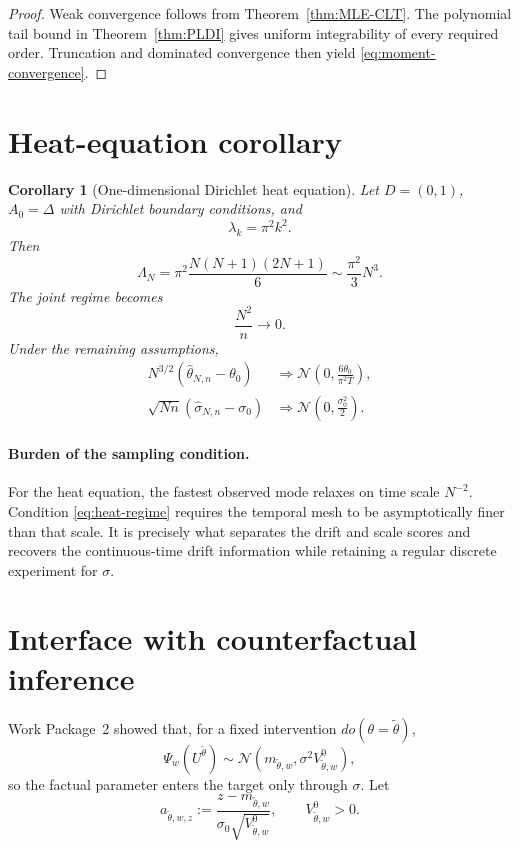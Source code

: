 \documentclass[11pt]{article}
\newtheorem{corollary}[assumption]{Corollary}
\theoremstyle{remark}
\newcommand{\1}{\mathbf 1}
\newcommand{\LamN}{\Lambda_N}
\begin{document}
\begin{proof}
Weak convergence follows from Theorem~\ref{thm:MLE-CLT}.  The polynomial tail bound in Theorem~\ref{thm:PLDI} gives uniform integrability of every required order.  Truncation and dominated convergence then yield \eqref{eq:moment-convergence}.
\end{proof}

\section{Heat-equation corollary}

\begin{corollary}[One-dimensional Dirichlet heat equation]\label{cor:heat}
Let $D=(0,1)$, $A_0=\Delta$ with Dirichlet boundary conditions, and
\[
 \lambda_k=\pi^2k^2.
\]
Then
\[
 \LamN
 =\pi^2\frac{N(N+1)(2N+1)}6
 \sim\frac{\pi^2}{3}N^3.
\]
The joint regime becomes
\begin{equation}\label{eq:heat-regime}
 \frac{N^2}{n}\longrightarrow0.
\end{equation}
Under the remaining assumptions,
\begin{align}
 N^{3/2}(\widehat\theta_{N,n}-\theta_0)
 &\Rightarrow
 \mathcal N\!\left(0,\frac{6\theta_0}{\pi^2T}\right),\label{eq:heat-theta}\\
 \sqrt{Nn}(\widehat\sigma_{N,n}-\sigma_0)
 &\Rightarrow
 \mathcal N\!\left(0,\frac{\sigma_0^2}{2}\right).
 \label{eq:heat-sigma}
\end{align}
\end{corollary}

\paragraph{Burden of the sampling condition.}
For the heat equation, the fastest observed mode relaxes on time scale $N^{-2}$.  Condition \eqref{eq:heat-regime} requires the temporal mesh to be asymptotically finer than that scale.  It is precisely what separates the drift and scale scores and recovers the continuous-time drift information while retaining a regular discrete experiment for $\sigma$.

\section{Interface with counterfactual inference}

Work Package~2 showed that, for a fixed intervention $do(\theta=\widetilde\theta)$,
\[
 \Psi_w(U^{\widetilde\theta})
 \sim\mathcal N(m_{\widetilde\theta,w},\sigma^2V^0_{\widetilde\theta,w}),
\]
so the factual parameter enters the target only through $\sigma$.  Let
\[
 a_{\widetilde\theta,w,z}
 :=\frac{z-m_{\widetilde\theta,w}}
 {\sigma_0\sqrt{V^0_{\widetilde\theta,w}}},
 \qquad V^0_{\widetilde\theta,w}>0.
\]
\end{document}
